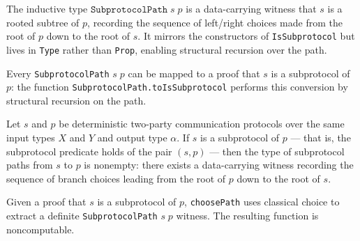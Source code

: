 \begin{definition}
\label{CommunicationComplexity.Deterministic.Protocol.SubprotocolPath}
\leanok
{}
The inductive type $\texttt{SubprotocolPath}\; s\; p$ is a data-carrying witness that $s$ is a
rooted subtree of $p$, recording the sequence of left/right choices made from the root of
$p$ down to the root of $s$.  It mirrors the constructors of \texttt{IsSubprotocol} but lives
in \texttt{Type} rather than \texttt{Prop}, enabling structural recursion over the path.
\end{definition}

\begin{definition}
\label{CommunicationComplexity.Deterministic.Protocol.SubprotocolPath.toIsSubprotocol}
\leanok
{}
Every \texttt{SubprotocolPath} $s\; p$ can be mapped to a proof that $s$ is a subprotocol of
$p$: the function \texttt{SubprotocolPath.toIsSubprotocol} performs this conversion by
structural recursion on the path.
\end{definition}

\begin{theorem}
\label{CommunicationComplexity.Deterministic.Protocol.path_exists_of_isSubprotocol}
\leanok
{}
Let $s$ and $p$ be deterministic two-party communication protocols over the same input
types $X$ and $Y$ and output type $\alpha$. If $s$ is a subprotocol of $p$ — that is,
the subprotocol predicate holds of the pair $(s, p)$ — then the type of subprotocol
paths from $s$ to $p$ is nonempty: there exists a data-carrying witness recording the
sequence of branch choices leading from the root of $p$ down to the root of $s$.
\end{theorem}

\begin{definition}
\label{CommunicationComplexity.Deterministic.Protocol.choosePath}
\leanok
{}
Given a proof that $s$ is a subprotocol of $p$, \texttt{choosePath} uses classical choice to
extract a definite \texttt{SubprotocolPath} $s\; p$ witness.  The resulting function is
noncomputable.
\end{definition}

